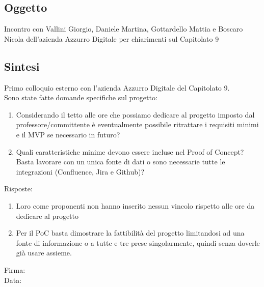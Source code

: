 \documentclass[12pt]{article}
\begin{document}
\subsection{Oggetto}
Incontro con Vallini Giorgio, Daniele Martina, Gottardello Mattia e Boscaro Nicola dell'azienda Azzurro Digitale per chiarimenti sul Capitolato 9
\subsection{Sintesi}
Primo colloquio esterno con l'azienda Azzurro Digitale del Capitolato 9.\\
\vspace{2mm}
Sono state fatte domande specifiche sul progetto:
\begin{enumerate}
\item Considerando il tetto alle ore che possiamo dedicare al progetto imposto dal professore/committente è eventualmente possibile ritrattare i requisiti minimi e il MVP se necessario in futuro?
\item Quali caratteristiche minime devono essere incluse nel Proof of Concept?Basta lavorare con un unica fonte di dati o sono necessarie tutte le integrazioni (Confluence, Jira e Github)?
\end{enumerate}

Risposte:
\begin{enumerate}
\item Loro come proponenti non hanno inserito nessun vincolo rispetto alle ore da dedicare al progetto
\item Per il PoC basta dimostrare la fattibilità del progetto limitandosi ad una fonte di informazione o a tutte e tre prese singolarmente, quindi senza doverle già usare assieme.
\end{enumerate}

\vfill
\begin{minipage}{10cm}
Firma: \hrulefill \\
\vspace{2mm}
Data: \dotfill
\end{minipage}
\end{document}
